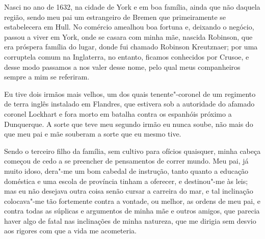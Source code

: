 Nasci no ano de 1632, na cidade de York e em boa família, ainda que não
daquela região, sendo meu pai um estrangeiro de Bremen que primeiramente
se estabelecera em Hull. No comércio amealhou boa fortuna e, deixando o
negócio, passou a viver em York, onde se casara com minha mãe, nascida
Robinson, que era próspera família do lugar, donde fui chamado Robinson
Kreutznaer; por uma corruptela comum na Inglaterra, no entanto, ficamos
conhecidos por Crusoe, e desse modo passamos a nos valer desse nome,
pelo qual meus companheiros sempre a mim se referiram.

Eu tive dois irmãos mais velhos, um dos quais tenente"-coronel de um
regimento de terra inglês instalado em Flandres, que estivera sob a
autoridade do afamado coronel Lockhart e fora morto em batalha contra os
espanhóis próximo a Dunquerque. A sorte que teve meu segundo irmão eu
nunca soube, não mais do que meu pai e mãe souberam a sorte que eu mesmo
tive.

Sendo o terceiro filho da família, sem cultivo para ofícios quaisquer,
minha cabeça começou de cedo a se preencher de pensamentos de correr
mundo. Meu pai, já muito idoso, dera"-me um bom cabedal de instrução,
tanto quanto a educação doméstica e uma escola de província tinham a
oferecer, e destinou"-me às leis; mas eu não desejava outra coisa senão
cursar a carreira do mar, e tal inclinação colocava"-me tão fortemente
contra a vontade, ou melhor, as ordens de meu pai, e contra todas as
súplicas e argumentos de minha mãe e outros amigos, que parecia haver
algo de fatal nas inclinações de minha natureza, que me dirigia sem
desvio aos rigores com que a vida me acometeria.

